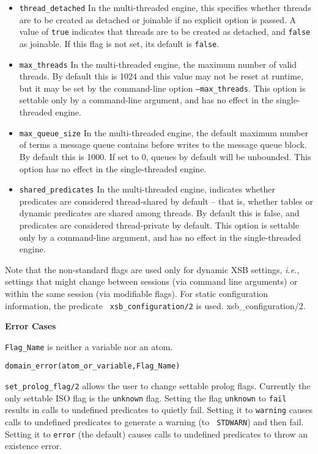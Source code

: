 \begin{description}
\begin{itemize}
\item {\tt thread\_detached} In the multi-threaded engine, this
  specifies whether threads are to be created as detached or joinable
  if no explicit option is passed.  A value of {\tt true} indicates
  that threads are to be created as detached, and {\tt false} as
  joinable.  If this flag is not set, its default is {\tt false}.

\item {\tt max\_threads} In the multi-threaded engine, the maximum
  number of valid threads.  By default this is 1024 and this value may
  not be reset at runtime, but it may be set by the command-line
  option {\tt --max\_threads}.  This option is settable only by a
  command-line argument, and has no effect in the single-threaded
  engine.

\item {\tt max\_queue\_size} In the multi-threaded engine, the default
  maximum number of terms a message queue contains before writes to
  the message queue block.  By default this is 1000.  If set to 0,
  queues by default will be unbounded.  This option has no effect in
  the single-threaded engine.

\item {\tt shared\_predicates} In the multi-threaded engine, indicates
  whether predicates are considered thread-shared by default -- that
  is, whether tables or dynamic predicates are shared among threads.
  By default this is false, and predicates are considered
  thread-private by default.  This option is settable only by a
  command-line argument, and has no effect in the
  single-threaded engine.

\end{itemize}
    
Note that the non-standard flags are used only for dynamic XSB
settings, {\it i.e.}, settings that might change between sessions (via
command line arguments) or within the same session (via modifiable
flags).  For static configuration information, the predicate {\tt
  xsb\_configuration/2} is used. {xsb\_configuration/2}.

{\bf Error Cases}
\bi
\item 	{\tt Flag\_Name} is neither a variable nor an atom.
\bi
\item 	{\tt domain\_error(atom\_or\_variable,Flag\_Name)}
\ei
\ei

%
{\tt set\_prolog\_flag/2} allows the user to change settable prolog
flags.  Currently the only settable ISO flag is the {\tt unknown}
flag.  Setting the flag {\tt unknown} to {\tt fail} results in calls
to undefined predicates to quietly fail.  Setting it to {\tt warning}
causes calls to undefined predicates to generate a warning (to {\tt
  STDWARN}) and then fail.  Setting it to {\tt error} (the default)
causes calls to undefined predicates to throw an existence error.


\end{description}
